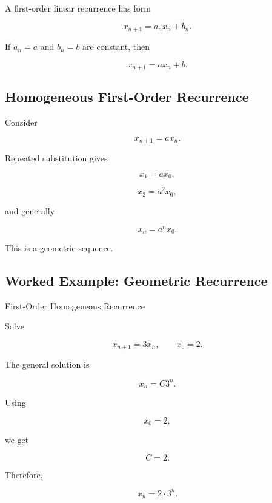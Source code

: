 A first-order linear recurrence has form

\[
\boxed{
x_{n+1}
=
a_nx_n+b_n.
}
\]

If \(a_n=a\) and \(b_n=b\) are constant, then

\[
\boxed{
x_{n+1}
=
ax_n+b.
}
\]

\subsection{Homogeneous First-Order Recurrence}
\label{subsec:first-order-homogeneous-recurrence}

Consider

\[
\boxed{
x_{n+1}=ax_n.
}
\]

Repeated substitution gives

\[
x_1=ax_0,
\]

\[
x_2=a^2x_0,
\]

and generally

\[
\boxed{
x_n=a^nx_0.
}
\]

This is a geometric sequence.

\subsection{Worked Example: Geometric Recurrence}
\label{subsec:worked-geometric-recurrence}

\begin{workedexamplebox}{First-Order Homogeneous Recurrence}

Solve

\[
x_{n+1}=3x_n,
\qquad
x_0=2.
\]

The general solution is

\[
x_n=C3^n.
\]

Using

\[
x_0=2,
\]

we get

\[
C=2.
\]

Therefore,

\begin{answerbox}
\[
\boxed{
x_n=2\cdot3^n.
}
\]
\end{answerbox}

\end{workedexamplebox}

